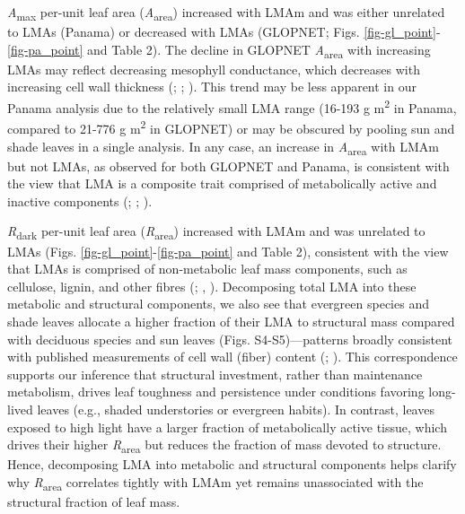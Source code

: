 \documentclass[
  12pt,
  letterpaper,
  DIV=11,
  numbers=noendperiod]{scrartcl}
\begin{document}
\emph{A}\textsubscript{max} per-unit leaf area
(\emph{A}\textsubscript{area}) increased with LMAm and was either
unrelated to LMAs (Panama) or decreased with LMAs (GLOPNET; Figs.
\ref{fig-gl_point}-\ref{fig-pa_point} and Table 2). The decline in
GLOPNET \emph{A}\textsubscript{area} with increasing LMAs may reflect
decreasing mesophyll conductance, which decreases with increasing cell
wall thickness (;
;
). This trend may be less
apparent in our Panama analysis due to the relatively small LMA range
(16-193 g m\textsuperscript{2} in Panama, compared to 21-776 g
m\textsuperscript{2} in GLOPNET) or may be obscured by pooling sun and
shade leaves in a single analysis. In any case, an increase in
\emph{A}\textsubscript{area} with LMAm but not LMAs, as observed for
both GLOPNET and Panama, is consistent with the view that LMA is a
composite trait comprised of metabolically active and inactive
components (;
;
).

\emph{R}\textsubscript{dark} per-unit leaf area
(\emph{R}\textsubscript{area}) increased with LMAm and was unrelated to
LMAs (Figs. \ref{fig-gl_point}-\ref{fig-pa_point} and Table 2),
consistent with the view that LMAs is comprised of non-metabolic leaf
mass components, such as cellulose, lignin, and other fibres
(;
,
). Decomposing total LMA into these
metabolic and structural components, we also see that evergreen species
and shade leaves allocate a higher fraction of their LMA to structural
mass compared with deciduous species and sun leaves (Figs.
S4-S5)---patterns broadly consistent with published measurements of cell
wall (fiber) content (;
). This correspondence
supports our inference that structural investment, rather than
maintenance metabolism, drives leaf toughness and persistence under
conditions favoring long-lived leaves (e.g., shaded understories or
evergreen habits). In contrast, leaves exposed to high light have a
larger fraction of metabolically active tissue, which drives their
higher \emph{R}\textsubscript{area} but reduces the fraction of mass
devoted to structure. Hence, decomposing LMA into metabolic and
structural components helps clarify why \emph{R}\textsubscript{area}
correlates tightly with LMAm yet remains unassociated with the
structural fraction of leaf mass.
\end{document}
